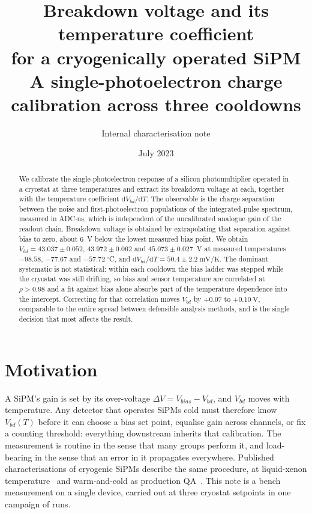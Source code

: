 \documentclass[10pt,twocolumn]{article}
\title{\vspace{-1.2em}\textbf{Breakdown voltage and its temperature coefficient\\
for a cryogenically operated SiPM}\\[0.3em]
\large A single-photoelectron charge calibration across three cooldowns}
\author{\normalsize Internal characterisation note}
\date{\normalsize July 2023}
\begin{document}
\maketitle

\begin{abstract}
\noindent
We calibrate the single-photoelectron response of a silicon photomultiplier
operated in a cryostat at three temperatures and extract its breakdown voltage
at each, together with the temperature coefficient
$\mathrm{d}V_{bd}/\mathrm{d}T$. The observable is the charge separation between
the noise and first-photoelectron populations of the integrated-pulse spectrum,
measured in ADC$\cdot$ns, which is independent of the uncalibrated analogue gain
of the readout chain. Breakdown voltage is obtained by extrapolating that
separation against bias to zero, about 6~V below the lowest measured
bias point. We obtain $V_{bd} = 43.037 \pm 0.052$, $43.972 \pm 0.062$ and
$45.073 \pm 0.027$~V at measured temperatures $-98.58$, $-77.67$ and
$-57.72~^\circ$C, and
$\mathrm{d}V_{bd}/\mathrm{d}T = 50.4 \pm 2.2~\mathrm{mV/K}$.
The dominant systematic is not statistical: within each cooldown the bias
ladder was stepped while the cryostat was still drifting, so bias and sensor
temperature are correlated at $\rho > 0.98$ and a fit against bias alone
absorbs part of the temperature dependence into the intercept. Correcting for
that correlation moves $V_{bd}$ by $+0.07$ to $+0.10~\mathrm{V}$, comparable to
the entire spread between defensible analysis methods, and is the single
decision that most affects the result.
\end{abstract}

\section{Motivation}

A SiPM's gain is set by its over-voltage $\Delta V = V_{bias} - V_{bd}$, and
$V_{bd}$ moves with temperature. Any detector that operates SiPMs cold must
therefore know $V_{bd}(T)$ before it can choose a bias set point, equalise gain
across channels, or fix a counting threshold: everything downstream inherits
that calibration. The measurement is routine in the sense that many groups
perform it, and load-bearing in the sense that an error in it propagates
everywhere. Published characterisations of cryogenic SiPMs describe the same
procedure, at liquid-xenon temperature~\cite{ostrovskiy2015} and warm-and-cold
as production QA~\cite{ds20k2026}. This note is a bench measurement on a single
device, carried out at three cryostat setpoints in one campaign of runs.
\end{document}
